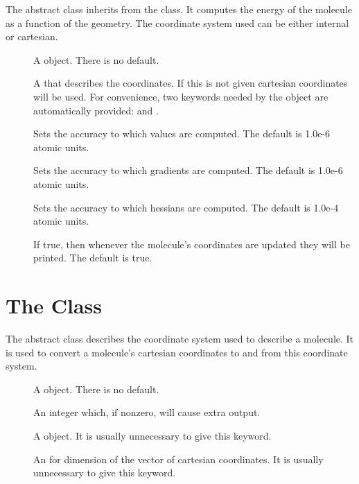 The  abstract class inherits from the
 class.  It computes the energy of the
molecule as a function of the geometry.  The coordinate system
used can be either internal or cartesian.

\begin{description}
  \item[] A  object.  There is no
    default.

  \item[] A  that describes the
    coordinates.  If this is not given cartesian coordinates will be used.
    For convenience, two keywords needed by the 
    object are automatically provided:  and
    .

  \item[] Sets the accuracy to which values are
    computed.  The default is 1.0e-6 atomic units.

  \item[] Sets the accuracy to which gradients
    are computed.  The default is 1.0e-6 atomic units.

  \item[] Sets the accuracy to which hessians are
    computed.  The default is 1.0e-4 atomic units.

  \item[] If true, then whenever the
    molecule's coordinates are updated they will be printed.  The default
    is true.
\end{description}


\section{The  Class}\label{MolecularCoor}

The  abstract class describes the coordinate system
used to describe a molecule.  It is used to convert a molecule's cartesian
coordinates to and from this coordinate system.

\begin{description}
  \item[] A  object.  There is no
    default.

  \item[] An integer which, if nonzero, will cause extra
    output.

  \item[] A  object.  It is
    usually unnecessary to give this keyword.

  \item[] An  for dimension
    of the vector of cartesian coordinates.  It is
    usually unnecessary to give this keyword.
\end{description}

